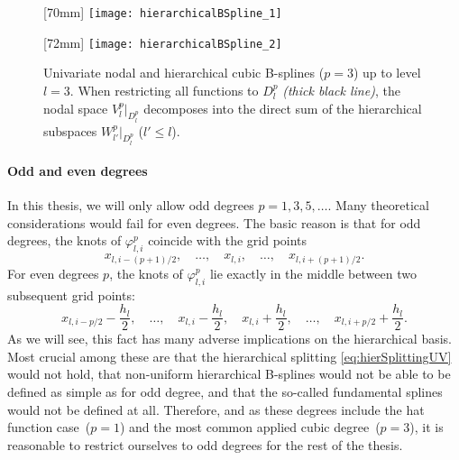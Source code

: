 \begin{figure}
  [70mm]{%
    \texttt{[image: hierarchicalBSpline\_1]}%
  }%
  \hfill%
  \hfill%
  [72mm]{%
    \texttt{[image: hierarchicalBSpline\_2]}%
  }%
  \caption{%
    Univariate nodal and hierarchical cubic B-splines ($p = 3$)
    up to level $l = 3$.
    When restricting all functions to $D_l^p$ \emph{(thick black line)},
    the nodal space $V_l^p|_{D_l^p}$ decomposes into the direct sum
    of the hierarchical subspaces $W_{l'}^p|_{D_l^p}$ ($l' \le l$).%
  }
  \label{fig:hierarchicalBSpline}
\end{figure}

\paragraph{Odd and even degrees}

In this thesis, we will only allow odd degrees $p = 1, 3, 5, \dotsc$.
Many theoretical considerations would fail for even degrees.
The basic reason is that for odd degrees, the knots of
$\varphi_{l,i}^p$ coincide with the grid points
\begin{equation}
  x_{l,i-(p+1)/2},\quad
  \dotsc,\quad
  x_{l,i},\quad
  \dotsc,\quad
  x_{l,i+(p+1)/2}.
\end{equation}
For even degrees $p$, the knots of $\varphi_{l,i}^p$ lie exactly in
the middle between two subsequent grid points:
\begin{equation}
  x_{l,i-p/2} - \frac{h_l}{2},\quad
  \dotsc,\quad
  x_{l,i} - \frac{h_l}{2},\quad
  x_{l,i} + \frac{h_l}{2},\quad
  \dotsc,\quad
  x_{l,i+p/2} + \frac{h_l}{2}.
\end{equation}
As we will see,
this fact has many adverse implications on the hierarchical basis.
Most crucial among these are
that the hierarchical splitting \eqref{eq:hierSplittingUV} would not hold,
that non-uniform hierarchical B-splines would not be able to be defined as
simple as for odd degree,
 and
that the so-called fundamental splines would not be defined at all.
Therefore, and
as these degrees include the hat function case~($p = 1$) and the
most common applied cubic degree~($p = 3$),
it is reasonable to restrict ourselves to odd degrees
for the rest of the thesis.



